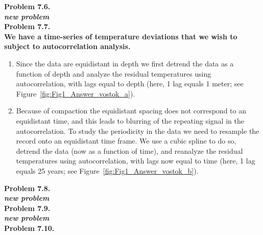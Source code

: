 \noindent
\bf{Problem 7.6.} \\

{\it new problem}\\

\noindent
\bf{Problem 7.7.}
\\

\noindent
We have a time-series of temperature deviations that we wish to subject to autocorrelation analysis.
\begin{enumerate}[label=\alph*)]
\item Since the data are equidistant in depth we first detrend the data as a function of depth and analyze the
residual temperatures using autocorrelation, with lags equal to depth (here, 1 lag equals 1 meter; see Figure~\ref{fig:Fig1_Answer_vostok_a}).
\item Because of compaction the equidistant spacing does not correspond to an equidistant time, and this leads to blurring of the
repeating signal in the autocorrelation. To study the periodicity in the
data we need to resample the record onto an equidistant time frame.  We use a cubic spline to do so,  detrend the data (now as a function of time), and reanalyze the
residual temperatures using autocorrelation, with lags now equal to time (here, 1 lag equals 25 years; see Figure~\ref{fig:Fig1_Answer_vostok_b}).
\end{enumerate}

\noindent
\bf{Problem 7.8.} \\

{\it new problem}\\

\noindent
\bf{Problem 7.9.} \\

{\it new problem}\\

\noindent
\bf{Problem 7.10.} \\

